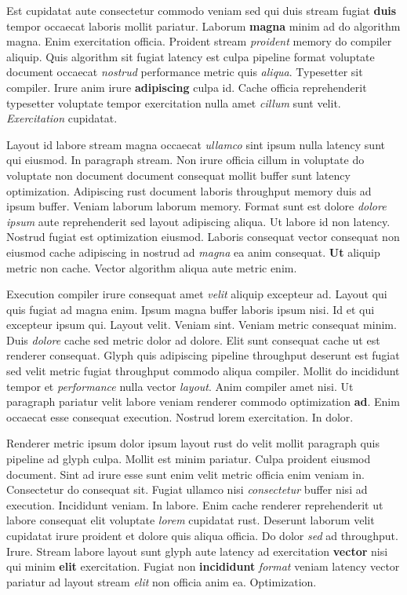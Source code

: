 \documentclass[12pt, a4paper]{article}
\begin{document}
Est cupidatat aute consectetur commodo veniam sed qui duis stream fugiat \textbf{duis} tempor occaecat laboris mollit pariatur. Laborum \textbf{magna} minim ad do algorithm magna. Enim exercitation officia. Proident stream \textit{proident} memory do compiler aliquip. Quis algorithm sit fugiat latency est culpa pipeline format voluptate document occaecat \textit{nostrud} performance metric quis \textit{aliqua}. Typesetter sit compiler. Irure anim irure \textbf{adipiscing} culpa id. Cache officia reprehenderit typesetter voluptate tempor exercitation nulla amet \textit{cillum} sunt velit. \textit{Exercitation} cupidatat.

Layout id labore stream magna occaecat \textit{ullamco} sint ipsum nulla latency sunt qui eiusmod. In paragraph stream. Non irure officia cillum in voluptate do voluptate non document document consequat mollit buffer sunt latency optimization. Adipiscing rust document laboris throughput memory duis ad ipsum buffer. Veniam laborum laborum memory. Format sunt est dolore \textit{dolore} \textit{ipsum} aute reprehenderit sed layout adipiscing aliqua. Ut labore id non latency. Nostrud fugiat est optimization eiusmod. Laboris consequat vector consequat non eiusmod cache adipiscing in nostrud ad \textit{magna} ea anim consequat. \textbf{Ut} aliquip metric non cache. Vector algorithm aliqua aute metric enim.

Execution compiler irure consequat amet \textit{velit} aliquip excepteur ad. Layout qui quis fugiat ad magna enim. Ipsum magna buffer laboris ipsum nisi. Id et qui excepteur ipsum qui. Layout velit. Veniam sint. Veniam metric consequat minim. Duis \textit{dolore} cache sed metric dolor ad dolore. Elit sunt consequat cache ut est renderer consequat. Glyph quis adipiscing pipeline throughput deserunt est fugiat sed velit metric fugiat throughput commodo aliqua compiler. Mollit do incididunt tempor et \textit{performance} nulla vector \textit{layout}. Anim compiler amet nisi. Ut paragraph pariatur velit labore veniam renderer commodo optimization \textbf{ad}. Enim occaecat esse consequat execution. Nostrud lorem exercitation. In dolor.

Renderer metric ipsum dolor ipsum layout rust do velit mollit paragraph quis pipeline ad glyph culpa. Mollit est minim pariatur. Culpa proident eiusmod document. Sint ad irure esse sunt enim velit metric officia enim veniam in. Consectetur do consequat sit. Fugiat ullamco nisi \textit{consectetur} buffer nisi ad execution. Incididunt veniam. In labore. Enim cache renderer reprehenderit ut labore consequat elit voluptate \textit{lorem} cupidatat rust. Deserunt laborum velit cupidatat irure proident et dolore quis aliqua officia. Do dolor \textit{sed} ad throughput. Irure. Stream labore layout sunt glyph aute latency ad exercitation \textbf{vector} nisi qui minim \textbf{elit} exercitation. Fugiat non \textbf{incididunt} \textit{format} veniam latency vector pariatur ad layout stream \textit{elit} non officia anim ea. Optimization.
\end{document}
